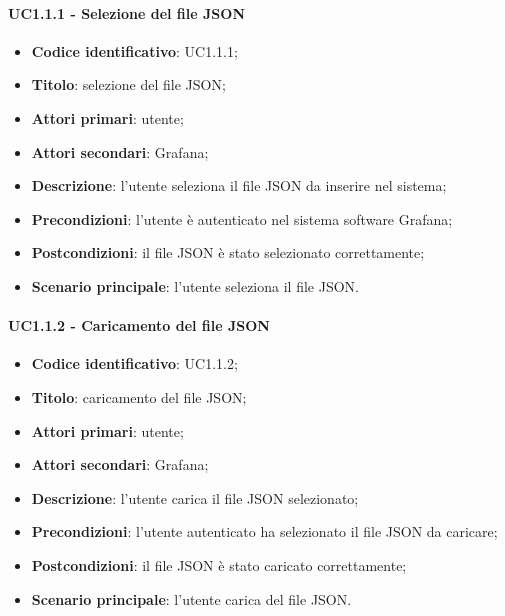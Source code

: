 \paragraph{UC1.1.1 - Selezione del file JSON}
\begin{itemize}
	\item \textbf{Codice identificativo}: UC1.1.1;
	\item \textbf{Titolo}: selezione del file JSON;
	\item \textbf{Attori primari}: utente;
	\item \textbf{Attori secondari}: Grafana\glo;
	\item \textbf{Descrizione}: l'utente seleziona il file JSON da inserire nel sistema;
	\item \textbf{Precondizioni}: l'utente è autenticato nel sistema software Grafana\glo;
	\item \textbf{Postcondizioni}: il file JSON è stato selezionato correttamente;
	\item \textbf{Scenario principale}: l'utente seleziona il file JSON.
\end{itemize}

\paragraph{UC1.1.2 - Caricamento del file JSON}
\begin{itemize}
	\item \textbf{Codice identificativo}: UC1.1.2;
	\item \textbf{Titolo}: caricamento del file JSON;
	\item \textbf{Attori primari}: utente;
	\item \textbf{Attori secondari}: Grafana\glo;
	\item \textbf{Descrizione}: l'utente carica il file JSON selezionato;
	\item \textbf{Precondizioni}: l'utente autenticato ha selezionato il file JSON da caricare;
	\item \textbf{Postcondizioni}: il file JSON è stato caricato correttamente;
	\item \textbf{Scenario principale}: l'utente carica del file JSON.
\end{itemize}

